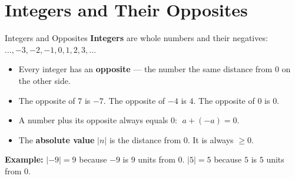 \section{Integers and Their Opposites}

\begin{quickReview}{Integers and Opposites}
\textbf{Integers} are whole numbers and their negatives: $\ldots, -3, -2, -1, 0, 1, 2, 3, \ldots$

\begin{itemize}[leftmargin=*]
    \item Every integer has an \textbf{opposite} — the number the same distance from $0$ on the other side.
    \item The opposite of $7$ is $-7$. The opposite of $-4$ is $4$. The opposite of $0$ is $0$.
    \item A number plus its opposite always equals $0$: $\;a + (-a) = 0$.
    \item The \textbf{absolute value} $|n|$ is the distance from $0$. It is always $\geq 0$.
\end{itemize}

\medskip
\textbf{Example:} $|{-9}| = 9$ because $-9$ is $9$ units from $0$. \quad $|5| = 5$ because $5$ is $5$ units from $0$.
\end{quickReview}

